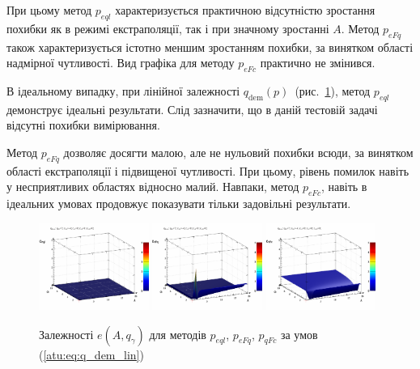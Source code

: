 При цьому метод
$ p_{eql} $ характеризується практичною відсутністю зростання
похибки як в режимі екстраполяції, так і при значному зростанні
$ A $. Метод
$ p_{eFq} $ також характеризується істотно меншим зростанням
похибки, за винятком області надмірної чутливості. Вид графіка
для методу
$ p_{eFc} $ практично не змінився.

В ідеальному випадку, при лінійної залежності
$ q_\mathrm{dem} (p) $~(рис.~\ref{atu:f:qsl_pe_A_qg_lin}), метод
$ p_{eql} $ демонструє ідеальні результати. Слід зазначити, що в
даній тестовій задачі відсутні похибки вимірювання.

Метод
$ p_{eFq} $ дозволяє досягти малою, але не нульовий
похибки всюди, за винятком області екстраполяції і підвищеної
чутливості. При цьому, рівень помилок навіть у несприятливих
областях відносно малий. Навпаки, метод
$ p_{eFc} $, навіть в ідеальних умовах продовжує показувати тільки задовільні
результати.

\begin{figure}[htb!]
  \begin{center}
    \includegraphics[width=0.32\textwidth]{p/qls_pe-p_A_qg_eql_lin.png}
    \hfill
    \includegraphics[width=0.32\textwidth]{p/qls_pe-p_A_qg_eFq_lin.png}
    \hfill
    \includegraphics[width=0.32\textwidth]{p/qls_pe-p_A_qg_eFc_lin.png}
  \end{center}
  \caption{Залежності $e(A,q_\gamma)$ для методів $p_{eql}$, $p_{eFq}$, $p_{qFc}$ за умов (\ref{atu:eq:q_dem_lin})}
  \label{atu:f:qsl_pe_A_qg_lin}
\end{figure}

